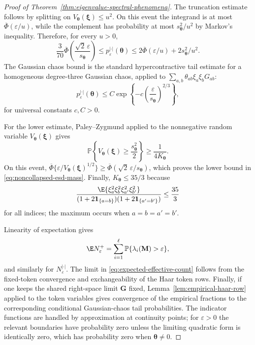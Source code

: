 \documentclass{article}
\newcommand{\Prob}{\mathbb{P}}
\newcommand{\bM}{\mathbf{M}}
\newcommand{\bG}{\mathbf{G}}
\newcommand{\barPhi}{\overline{\Phi}}
\theoremstyle{remark}
\begin{document}
\begin{proof}[Proof of Theorem~\ref{thm:eigenvalue-spectral-phenomena}]
The truncation estimate follows by splitting on
$V_{\boldsymbol{\theta}}(\boldsymbol{\xi})\leq u^2$.  On this event the
integrand is at most $\barPhi(\varepsilon/u)$, while the complement has
probability at most
$s_{\boldsymbol{\theta}}^2/u^2$ by Markov's inequality.  Therefore, for every
$u>0$,
\begin{equation}
    \frac{3}{70}
    \barPhi\left(
    \frac{\sqrt2\,\varepsilon}{s_{\boldsymbol{\theta}}}
    \right)
    \leq
    p_\varepsilon^{|\cdot|}(\boldsymbol{\theta})
    \leq
    2\barPhi(\varepsilon/u)+2s_{\boldsymbol{\theta}}^2/u^2.
    \label{eq:eigenvalue-tail-two-sided}
\end{equation}
The Gaussian chaos bound is the standard hypercontractive tail estimate for a
homogeneous degree-three Gaussian chaos, applied to
$\sum_{a,b}\theta_{ab}\xi_a\xi_bG_{ab}$:
\begin{equation}
    p_\varepsilon^{|\cdot|}(\boldsymbol{\theta})
    \leq
    C\exp\left\{
        -c\left(\frac{\varepsilon}{s_{\boldsymbol{\theta}}}\right)^{2/3}
    \right\},
    \label{eq:eigenvalue-chaos-tail-bound}
\end{equation}
for universal constants $c,C>0$.

For the lower estimate, Paley--Zygmund applied to the nonnegative random
variable $V_{\boldsymbol{\theta}}(\boldsymbol{\xi})$ gives
\[
    \Prob\left\{
    V_{\boldsymbol{\theta}}(\boldsymbol{\xi})
    \geq
    \frac{s_{\boldsymbol{\theta}}^2}{2}
    \right\}
    \geq
    \frac{1}{4K_{\boldsymbol{\theta}}}.
\]
On this event,
$\barPhi\{\varepsilon/V_{\boldsymbol{\theta}}(\boldsymbol{\xi})^{1/2}\}
\geq
\barPhi(\sqrt2\,\varepsilon/s_{\boldsymbol{\theta}})$, which proves
the lower bound in \eqref{eq:noncollapsed-esd-mass}.  Finally,
$K_{\boldsymbol{\theta}}\leq 35/3$ because
\[
    \frac{
    \E\{\xi_a^2\xi_b^2\xi_{a'}^2\xi_{b'}^2\}}
    {(1+2\mathbf 1_{\{a=b\}})(1+2\mathbf 1_{\{a'=b'\}})}
    \leq
    \frac{35}{3}
\]
for all indices; the maximum occurs when $a=b=a'=b'$.

Linearity of expectation gives
\[
    \E N_\varepsilon^+
    =
    \sum_{i=1}^{\ell}\Prob\{\lambda_i(\bM)>\varepsilon\},
\]
and similarly for $N_\varepsilon^{|\cdot|}$.  The limit in
\eqref{eq:expected-effective-count} follows from the fixed-token convergence
and exchangeability of the Haar token rows.  Finally, if one keeps the shared
right-space limit $\bG$ fixed, Lemma~\ref{lem:empirical-haar-row} applied to
the token variables gives convergence of the empirical fractions to the
corresponding conditional Gaussian-chaos tail probabilities.  The indicator
functions are handled by approximation at continuity points; for
$\varepsilon>0$ the relevant boundaries have probability zero unless the
limiting quadratic form is identically zero, which has probability zero when
$\boldsymbol{\theta}\neq0$.


\end{proof}
\end{document}
